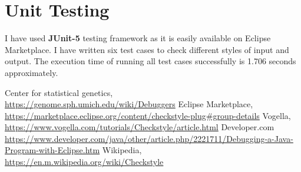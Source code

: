 \documentclass[11pt]{article}
\begin{document}
\section{Unit Testing}
I have used \textbf{JUnit-5} testing framework as it is easily available on Eclipse Marketplace. I have written six test cases to check different styles of input and output. The execution time of running all test cases successfully is 1.706 seconds approximately.
\begin{thebibliography}{9}
Center for statistical genetics,\\
\url{https://genome.sph.umich.edu/wiki/Debuggers}
Eclipse Marketplace,\\
\url{https://marketplace.eclipse.org/content/checkstyle-plug#group-details}
Vogella,\\
\url{https://www.vogella.com/tutorials/Checkstyle/article.html}
Developer.com\\
\url{https://www.developer.com/java/other/article.php/2221711/Debugging-a-Java-Program-with-Eclipse.htm}
Wikipedia,\\
\url{https://en.m.wikipedia.org/wiki/Checkstyle}
\end{thebibliography}
\end{document}
